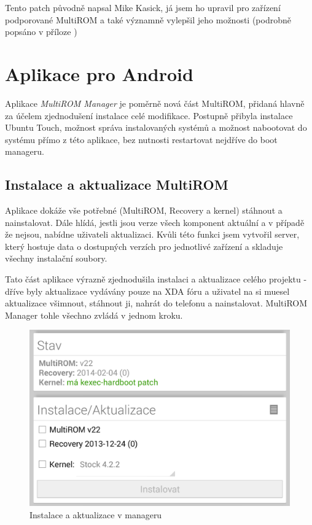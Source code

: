 \documentclass[12pt, a4paper, oneside]{article}
\newcommand{\It}{\textit}  %
\begin{document}
Tento patch původně napsal Mike Kasick\cite{kexec-hardboot-orig}, já jsem ho upravil pro zařízení podporované MultiROM a také významně vylepšil jeho možnosti (podrobně popsáno v příloze  )

\section{Aplikace pro Android}
Aplikace \It{MultiROM Manager} je poměrně nová část MultiROM, přidaná hlavně za účelem zjednodušení instalace celé modifikace. Postupně přibyla instalace Ubuntu Touch, možnost správa instalovaných systémů a možnost nabootovat do systému přímo z této aplikace, bez nutnosti restartovat nejdříve do boot manageru.

\subsection{Instalace a aktualizace MultiROM}
Aplikace dokáže vše potřebné (MultiROM, Recovery a kernel) stáhnout a nainstalovat. Dále hlídá, jestli jsou verze všech komponent aktuální a v případě že nejsou, nabídne uživateli aktualizaci. Kvůli této funkci jsem vytvořil server, který hostuje data o dostupných verzích pro jednotlivé zařízení a skladuje všechny instalační soubory.

Tato část aplikace výrazně zjednodušila instalaci a aktualizace celého projektu - dříve byly aktualizace vydávány pouze na XDA fóru a uživatel na si muesel aktualizace všimnout, stáhnout ji, nahrát do telefonu a nainstalovat. MultiROM Manager tohle všechno zvládá v jednom kroku.

\begin{figure}[H]
\begin{center}
 \includegraphics[width=\textwidth]{img/mgr_install.png}
\caption{Instalace a aktualizace v manageru}
\end{center}
\end{figure}
\end{document}
